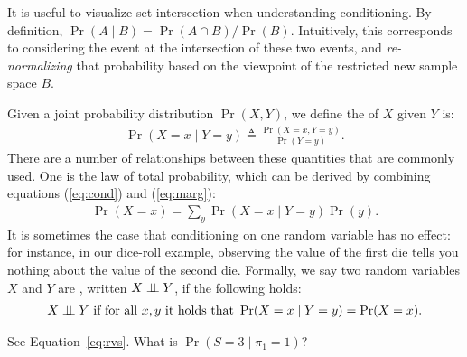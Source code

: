 \documentclass{tufte-handout}
\begin{document}
\begin{marginfigure}
    \caption{It is useful to visualize set intersection when understanding conditioning. 
    By definition, $\Pr(A \mid B) = \Pr(A \cap B)/\Pr(B)$. Intuitively, this corresponds to 
    considering the event at the intersection of these two events, and \emph{re-normalizing}
    that probability based on the viewpoint of the restricted new sample space $B$.
    }
\end{marginfigure}
Given a joint probability distribution $\Pr(X, Y)$, we define the 
of $X$ given $Y$ is:
\begin{align}
    \Pr(X=x \mid Y = y) \triangleq \frac{\Pr(X = x, Y = y)}{\Pr(Y = y)}.
    \label{eq:cond}
\end{align}
There are a number of relationships between these quantities that are commonly used.
One is the law of total probability, which can be derived by
combining equations (\ref{eq:cond}) and (\ref{eq:marg}):
\begin{align}
    \Pr(X=x) = \sum_y \Pr(X = x \mid Y = y)\Pr(y).
\end{align}
It is sometimes the case that conditioning on one random variable has no effect:
for instance, in our dice-roll example, observing the value of the first die
tells you nothing about the value of the second die. Formally, we say two 
random variables $X$ and $Y$ are , written $X \perp \!\!\! \perp Y$, if 
the following holds:
\begin{align*}
    X \perp \!\!\! \perp Y \text{ if for all }x, y \text{ it holds that } \Pr(X=x \mid Y=y) = \Pr(X = x).
\end{align*}


\begin{exercise}[$\star$]
    See Equation~\ref{eq:rvs}.  What is $\Pr(S = 3 \mid \pi_1 = 1)$?
\end{exercise}
\end{document}
